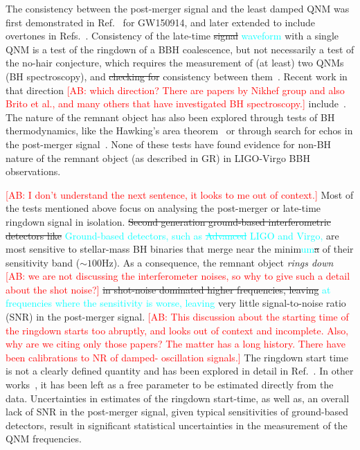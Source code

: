 \documentclass[twocolumn,prd,aps,superscriptaddress,preprintnumbers,tightenlines,showpacs,nofootinbib,eqsecnum,amsfonts,amsmath]{revtex4-1}
\newcommand{\ab}[1]{\textcolor{cyan}{#1}}
\newcommand{\comment}[1]{\textcolor{red}{[#1]}}
\begin{document}
The consistency between the post-merger signal and the least damped QNM was first demonstrated in 
Ref.~\citep{LSC_2016grtests} for GW150914, and later extended to include
overtones in Refs.~\citep{Brito:2018rfr,Giesler:2019uxc,Isi:2019aib,Bhagwat:2019dtm,Forteza:2020hbw}. Consistency
of the late-time \sout{signal} \ab{waveform} with a single QNM is a test of the ringdown of
a BBH coalescence, but not necessarily a test of the no-hair
conjecture, which requires the measurement of (at least) two QNMs (BH
spectroscopy), and \sout{checking for} consistency between them~\cite{Dreyer:2003bv,Berti:2005ys}. Recent work
in that direction \comment{AB: which direction? There are papers by Nikhef group and 
also Brito et al., and many others that have investigated BH spectroscopy.} include~\citep{Carullo:2018gah,Carullo:2019flw,Bhagwat:2019bwv}. The
nature of the remnant object has also been explored through tests of
BH thermodynamics, like the Hawking's area
theorem~\citep{Cabero:2017avf} or through search for echos in the
post-merger
signal~\citep{Nielsen:2018lkf,Tsang:2019zra,Lo:2018sep,Abedi:2018npz,Abedi:2020sgg,Testa:2018bzd}. None
of these tests have found evidence for non-BH nature of the remnant
object (as described in GR) in LIGO-Virgo BBH observations.

\comment{AB: I don't understand the next sentence, it looks to me out of context.} 
Most of the tests mentioned above focus on analysing the post-merger
or late-time ringdown signal in isolation. \sout{Second generation
ground-based interferometric detectors like} \ab{Ground-based detectors, 
such as \sout{Advanced} LIGO and Virgo,} are most sensitive to 
stellar-mass BH binaries that merge near the
minim\ab{um}\sout{a} of their sensitivity band ($\sim 100$Hz). As a consequence, the
remnant object \textit{rings down} \comment{AB: we are not discussing the interferometer noises, 
so why to give such a detail about the shot noise?} \sout{in shot-noise dominated higher
frequencies, leaving} \ab{at frequencies where the sensitivity is worse, leaving} 
very little signal-to-noise ratio (SNR) in the
post-merger signal. \comment{AB: This discussion about the starting time of the ringdown starts too abruptly, 
and looks out of context and incomplete. Also, why are we citing only those papers? The matter 
has a long history. There have been calibrations to NR of damped- oscillation signals.} 
The ringdown start time is not a clearly defined
quantity and has been explored in detail
in Ref.~\citep{Bhagwat:2017tkm}. In other
works~\citep{Carullo:2018gah,Carullo:2019flw}, it has been left as a
free parameter to be estimated directly from the data. Uncertainties
in estimates of the ringdown start-time, as well as, an overall lack of
SNR in the post-merger signal, given typical sensitivities of
ground-based detectors, result in significant statistical uncertainties
in the measurement of the QNM frequencies. 
\end{document}
